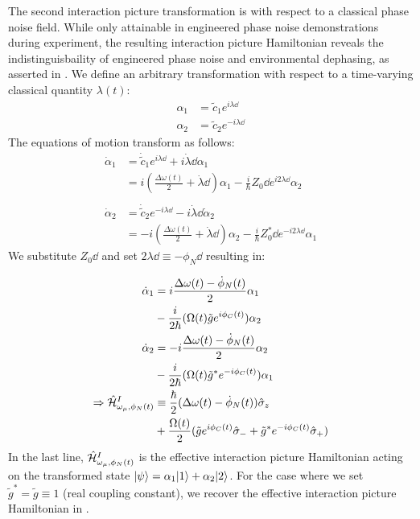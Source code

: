 The second interaction picture transformation is with respect to a classical phase noise field. While only attainable in engineered phase noise demonstrations during experiment, the resulting interaction picture Hamiltonian reveals the indistinguisbaility of engineered phase noise and environmental dephasing, as asserted in \cite{soare2014}. We define an arbitrary transformation with respect to a time-varying classical quantity $\lambda (t)$:
\begin{align}
\alpha_1 &= \tilde{c}_1e^{i\lambda\dd} \\
\alpha_2 &= \tilde{c}_2e^{-i\lambda\dd}
\end{align}
The equations of motion transform as follows:
\begin{align}
\dot{\alpha}_1 & = \dot{\tilde{c}}_1 e^{i \lambda\dd} + i \dot{\lambda}\dd \alpha_1 \nonumber \\
& =  i(\frac{\Delta \omega(t)}{2} + \dot{\lambda}\dd)\alpha_1 - \frac{i}{\hbar}Z_0\dd e^{i2\lambda\dd}\alpha_2 \\
& \nonumber \\
\dot{\alpha}_2 & = \dot{\tilde{c}}_2 e^{-i \lambda\dd} - i \dot{\lambda}\dd\dot{\alpha}_2 \nonumber \\
& =  -i(\frac{\Delta \omega(t)}{2} + \dot{\lambda}\dd)\alpha_2- \frac{i}{\hbar}Z_0^*\dd e^{-i2\lambda\dd}\alpha_1
\end{align}
We substitute $Z_0\dd$ and set $2\lambda\dd \equiv -\phi_N\dd$ resulting in:

\begin{align}
\dot{\alpha}_1 & =  i\frac{\Delta \omega(t) - \dot{\phi}_N \dd}{2}\alpha_1 \nonumber \\ %
& - \frac{i}{2\hbar}(\Omega\dd \tilde{g} e^{i\phi_C\dd}) \alpha_2  \\
\dot{\alpha}_2 & =  -i\frac{\Delta \omega(t) - \dot{\phi}_N\dd}{2}\alpha_2 \nonumber  \\ %
& - \frac{i}{2\hbar}(\Omega\dd \tilde{g}^* e^{-i\phi_C\dd})\alpha_1  \\
\Rightarrow \op{\mathcal{H}}^{I}_{\omega_\mu,\phi_N\dd} &\equiv \frac{\hbar}{2}(\Delta \omega(t)- \dot{\phi}_N\dd)\p{z} \nonumber \\
& + \frac{\Omega\dd}{2} (\tilde{g} e^{i\phi_C\dd}\p{-} + \tilde{g}^* e^{-i\phi_C\dd}\p{+}) \label{eqn:Hi}
\end{align}
In the last line, $\hat{\mathcal{H}}^{I}_{\omega_\mu,\phi_N(t)}$ is the effective interaction picture Hamiltonian acting on the transformed state $| \psi \rangle = \alpha_1| 1 \rangle + \alpha_2| 2 \rangle$. For the case where we set $\tilde{g}^* = \tilde{g} \equiv 1$ (real coupling constant), we recover the effective interaction picture Hamiltonian in \cite{soare2014}.


